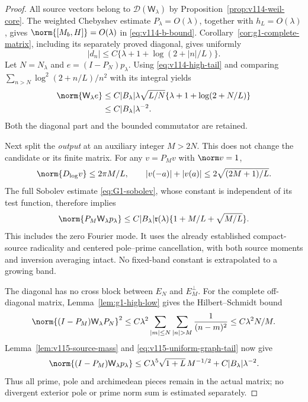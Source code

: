 \begin{proof}
All source vectors belong to $\mathcal D(\mathsf W_\lambda)$ by
Proposition~\ref{prop:v114-weil-core}. The weighted Chebyshev estimate
$P_\lambda=O(\lambda)$, together with $h_L=O(\lambda)$, gives
$\norm{[M_b,H]}=O(\lambda)$ in \eqref{eq:v114-b-bound}.
Corollary~\ref{cor:g1-complete-matrix}, including its separately proved
diagonal, gives uniformly
\[
 |d_n|\le C\{\lambda+1+\log(2+|n|/L)\}.
\]
Let $N=N_\lambda$ and $e=(I-P_N)p_\lambda$.
Using \eqref{eq:v114-high-tail} and comparing
$\sum_{n>N}\log^2(2+n/L)/n^2$ with its integral yields
\begin{align}
 \norm{\mathsf W_\lambda e}
 &\le C|B_\lambda|\lambda\sqrt{L/N}
        \{\lambda+1+\log(2+N/L)\}\notag\\
 &\le C|B_\lambda|\lambda^{-2}.
 \label{eq:v115-uniform-graph-tail}
\end{align}
Both the diagonal part and the bounded commutator are retained.

Next split the \emph{output} at an auxiliary integer $M>2N$.
This does not change the candidate or its finite matrix. For any
$v=P_Mv$ with $\norm v=1$,
\[
 \norm{D_{\log}v}\le2\pi M/L,\qquad
 |v(-a)|+|v(a)|\le2\sqrt{(2M+1)/L}.
\]
The full Sobolev estimate \eqref{eq:G1-sobolev}, whose constant is
independent of its test function, therefore implies
\begin{equation}\label{eq:v115-low-output}
 \norm{P_M\mathsf W_\lambda p_\lambda}
 \le C|B_\lambda|\mathfrak r(\lambda)
       \{1+M/L+\sqrt{M/L}\}.
\end{equation}
This includes the zero Fourier mode. It uses the already established
compact-source radicality and centered pole--prime cancellation, with
both source moments and inversion averaging intact. No fixed-band
constant is extrapolated to a growing band.

The diagonal has no cross block between $E_N$ and $E_M^\perp$.
For the complete off-diagonal matrix, Lemma~\ref{lem:g1-high-low}
gives the Hilbert--Schmidt bound
\[
 \norm{(I-P_M)\mathsf W_\lambda P_N}^2
 \le C\lambda^2\sum_{|m|\le N}\sum_{|n|>M}\frac1{(n-m)^2}
 \le C\lambda^2N/M.
\]
Lemma~\ref{lem:v115-source-mass} and
\eqref{eq:v115-uniform-graph-tail} now give
\begin{equation}\label{eq:v115-high-output}
 \norm{(I-P_M)\mathsf W_\lambda p_\lambda}
 \le C\lambda^5\sqrt{1+L}\,M^{-1/2}
         +C|B_\lambda|\lambda^{-2}.
\end{equation}
Thus all prime, pole and archimedean pieces remain in the actual matrix;
no divergent exterior pole or prime norm sum is estimated separately.


\end{proof}
